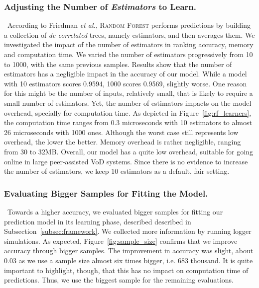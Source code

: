 \subsubsection{Adjusting the Number of \emph{Estimators} to Learn.}

\ According to Friedman \emph{et al.}, \textsc{Random Forest} performs predictions by building a collection of \emph{de-correlated} trees, namely estimators, and then averages them. We investigated the impact of the number of estimators in ranking accuracy, memory and computation time. We varied the number of estimators progressively from 10 to 1000, with the same previous samples. Results show that the number of estimators has a negligible impact in the accuracy of our model. While a model with 10 estimators scores 0.9594, 1000 scores 0.9569, slightly worse. One reason for this might be the number of inputs, relatively small, that is likely to require a small number of estimators. Yet, the number of estimators impacts on the model overhead, specially for computation time. As depicted in Figure~\ref{fig:rf_learners}, the computation time ranges from 0.3 microseconds with 10 estimators to almost 26 microseconds with 1000 ones. Although the worst case still represents low overhead, the lower the better. Memory overhead is rather negligible, ranging from 30 to 32MB. Overall, our model has a quite low overhead, suitable for going online in large peer-assisted VoD systems. Since there is no evidence to increase the number of estimators, we keep 10 estimators as a default, fair setting.

\subsubsection{Evaluating Bigger Samples for Fitting the Model.}

\ Towards a higher accuracy, we evaluated bigger samples for fitting our prediction model in its learning phase, described described in Subsection~\ref{subsec:framework}. We collected more information by running logger simulations. As expected, Figure~\ref{fig:sample_size} confirms that we improve accuracy through bigger samples. The improvement in accuracy was slight, about 0.03 as we use a sample size almost six times bigger, i.e. 683 thousand. It is quite important to highlight, though, that this has no impact on computation time of predictions. Thus, we use the biggest sample for the remaining evaluations.

